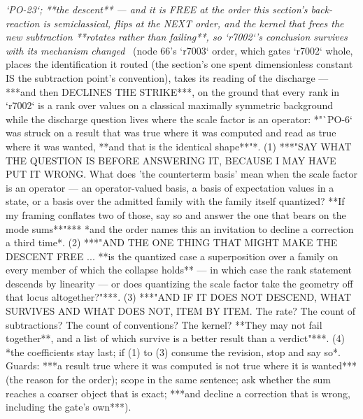\begin{description}
\textit{`PO-23`; **the descent** --- and it is FREE at the order this section's back-reaction is semiclassical, flips at the NEXT order, and the kernel that frees the new subtraction **rotates rather than failing**, so `r7002`'s conclusion survives with its mechanism changed} \ (node 66's `r7003` order, which gates `r7002` whole, places the identification it routed (the section's one spent dimensionless constant IS the subtraction point's convention), takes its reading of the discharge --- ***and then DECLINES THE STRIKE***, on the ground that every rank in `r7002` is a rank over values on a classical maximally symmetric background while the discharge question lives where the scale factor is an operator: *"`PO-6` was struck on a result that was true where it was computed and read as true where it was wanted, **and that is the identical shape**"*. (1) ***"SAY WHAT THE QUESTION IS BEFORE ANSWERING IT, BECAUSE I MAY HAVE PUT IT WRONG.  What does 'the counterterm basis' mean when the scale factor is an operator --- an operator-valued basis, a basis of expectation values in a state, or a basis over the admitted family with the family itself quantized?  **If my framing conflates two of those, say so and answer the one that bears on the mode sums**"***  *and the order names this an invitation to decline a correction a third time*. (2) ***"AND THE ONE THING THAT MIGHT MAKE THE DESCENT FREE ... **is the quantized case a superposition over a family on every member of which the collapse holds** --- in which case the rank statement descends by linearity --- or does quantizing the scale factor take the geometry off that locus altogether?"***. (3) ***"AND IF IT DOES NOT DESCEND, WHAT SURVIVES AND WHAT DOES NOT, ITEM BY ITEM.  The rate?  The count of subtractions?  The count of conventions?  The kernel?  **They may not fail together**, and a list of which survive is a better result than a verdict"***. (4) *the coefficients stay last; if (1) to (3) consume the revision, stop and say so*.  Guards: ***a result true where it was computed is not true where it is wanted*** (the reason for the order); scope in the same sentence; ask whether the sum reaches a coarser object that is exact; ***and decline a correction that is wrong, including the gate's own***). 

\end{description}
